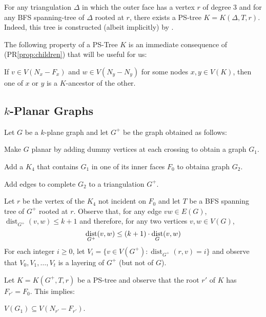 \documentclass{patmorin}
\DeclareMathOperator{\dist}{dist}
\renewcommand{\proplabel}[1]{\label{prop:#1}}
\renewcommand{\propref}[1]{(PR\ref{prop:#1})}
\begin{document}
For any triangulation $\Delta$ in which the outer face has a vertex $r$ of degree 3 and for any BFS spanning-tree of $\Delta$ rooted at $r$, there exists a PS-tree $K=K(\Delta,T,r)$.  Indeed, this tree is constructed (albeit implicitly) by \citet[Proof of Lemma~X]{dujmovic.joret.ea:planar}.

The following property of a PS-Tree $K$ is an immediate consequence of \propref{children} that will be useful for us:
\begin{compactenum}[(PR5)]
  \item \proplabel{ancestors} If $v\in V(N_x-F_x)$ and $w\in V(N_y-N_y)$ for some nodes $x,y\in V(K)$, then one of $x$ or $y$ is a $K$-ancestor of the other.
\end{compactenum}


\subsection{$k$-Planar Graphs}

Let $G$ be a $k$-plane graph and let $G^+$ be the graph obtained as follows:
\begin{compactenum}
  \item Make $G$ planar by adding dummy vertices at each crossing to obtain a graph $G_1$.
  \item Add a $K_4$ that contains $G_1$ in one of its inner faces $F_0$ to obtaina graph $G_2$.
  \item Add edges to complete $G_2$ to a triangulation $G^+$.
\end{compactenum}
Let $r$ be the vertex of the $K_4$ not incident on $F_0$ and let $T$ be a BFS spanning tree of $G^+$ rooted at $r$.    Observe that, for any edge $vw\in E(G)$, $\dist_{G^+}(v,w) \le k+1$ and therefore, for any two vertices $v,w\in V(G)$,
\begin{equation} 
  \dist_{G^+}(v,w) \le (k+1)\cdot \dist_G(v,w) \eqlabel{distance-preserving}
\end{equation}
For each integer $i\ge 0$, let $V_i=\{v\in V(G^+): \dist_{G^+}(r,v)=i\}$ and observe that $V_0,V_1,\ldots,V_{t}$ is a layering of $G^+$ (but not of $G$).

Let $K=K(G^+,T,r)$ be a PS-tree and observe that the root $r'$ of $K$ has $F_{r'}=F_0$.  This implies:
\begin{compactenum}[(PR6)]
  \item \proplabel{all-in}  $V(G_1)\subseteq V(N_{r'}-F_{r'})$.
\end{compactenum}
\end{document}
